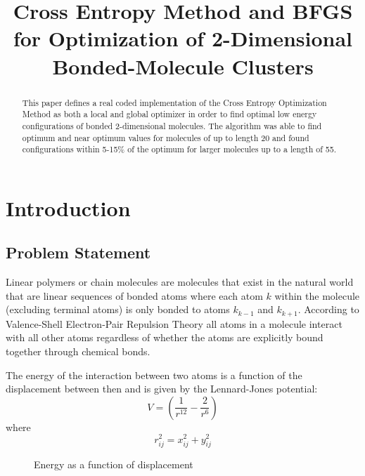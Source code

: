 \documentclass[conference,letterpaper]{IEEEtran}
\begin{document}
\title{Cross Entropy Method and BFGS for Optimization of 2-Dimensional Bonded-Molecule Clusters}
\author{
}

\maketitle

\begin{abstract}
    This paper defines a real coded implementation of the Cross Entropy Optimization Method as both a local and global optimizer in order to find optimal low energy configurations of bonded 2-dimensional molecules. The algorithm was able to find optimum and near optimum values for molecules of up to length 20 and found configurations within 5-15\% of the optimum for larger molecules up to a length of 55.
\end{abstract}

%
%   
\section{Introduction}
\subsection{Problem Statement}
\par Linear polymers or chain molecules are molecules that exist in the natural world that are linear sequences of bonded atoms where each atom $k$ within the molecule (excluding terminal atoms) is only bonded to atoms $k_{k - 1}$ and $k_{k + 1}$. According to Valence-Shell Electron-Pair Repulsion Theory all atoms in a molecule interact with all other atoms regardless of whether the atoms are explicitly bound together through chemical bonds.
\par The energy of the interaction between two atoms is a function of the displacement between then and is given by the Lennard-Jones potential:
\begin{equation}
    V = (\frac{1}{r^{12}} - \frac{2}{r^{6}})
\end{equation}
where
\begin{equation}
    r^{2}_{ij} = x^{2}_{ij} + y^{2}_{ij}
\end{equation}

\begin{figure}[h]
    \caption{Energy as a function of displacement}
    \label{energy}
\end{figure}
\end{document}
